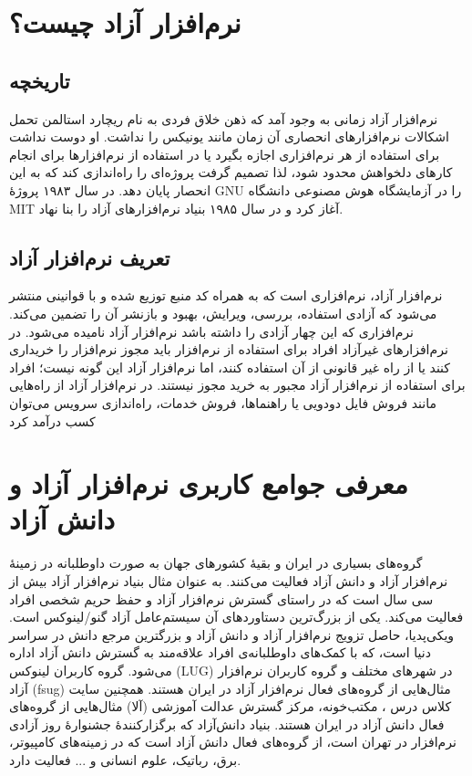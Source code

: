 \documentclass{article}
\begin{document}
\section{نرم‌افزار آزاد چیست؟}
\subsection{تاریخچه}
نرم‌افزار آزاد زمانی به وجود آمد که ذهن خلاق فردی به نام ریچارد استالمن تحمل اشکالات نرم‌افزارهای انحصاری آن زمان مانند یونیکس را نداشت. او دوست نداشت برای استفاده از هر نرم‌افزاری اجازه بگیرد یا در استفاده از نرم‌افزارها برای انجام کار‌های دلخواهش محدود شود، لذا تصمیم گرفت پروژه‌ای را راه‌اندازی کند که به این انحصار پایان دهد. در سال ۱۹۸۳ پروژهٔ GNU را در آزمایشگاه هوش مصنوعی دانشگاه MIT آغاز کرد و در سال ۱۹۸۵ بنیاد نرم‌افزار‌های آزاد را بنا نهاد.
\subsection{تعریف نرم‌افزار آزاد}
نرم‌افزار آزاد، نرم‌افزاری است که به همراه کد منبع توزیع شده و با قوانینی منتشر می‌شود که آزادی استفاده، بررسی، ویرایش، بهبود و بازنشر آن را تضمین می‌کند. نرم‌افزاری که این چهار آزادی را داشته باشد نرم‌افزار آزاد نامیده می‌شود. در نرم‌افزارهای غیرآزاد افراد برای استفاده از نرم‌افزار باید مجوز نرم‌افزار را خریداری کنند یا از راه غیر قانونی از آن استفاده کنند، اما نرم‌افزار آزاد این گونه نیست؛ افراد برای استفاده از نرم‌افزار آزاد مجبور به خرید مجوز نیستند. در نرم‌افزار آزاد از راه‌هایی مانند فروش فایل دودویی یا راهنماها، فروش خدمات، راه‌اندازی سرویس می‌توان کسب درآمد کرد
\section{معرفی جوامع کاربری نرم‌افزار آزاد و دانش آزاد}
گروه‌های بسیاری در ایران و بقیهٔ کشورهای جهان به صورت داوطلبانه در زمینهٔ نرم‌افزار آزاد و دانش آزاد فعالیت می‌کنند.
به عنوان مثال بنیاد نرم‌افزار آزاد بیش از سی سال است که در راستای گسترش نرم‌افزار آزاد و حفظ حریم شخصی افراد فعالیت می‌کند. یکی از بزرگ‌ترین دستاوردهای آن سیستم‌عامل آزاد گنو/لینوکس است.
ویکی‌پدیا، حاصل تزویج نرم‌افزار آزاد و دانش آزاد و بزرگترین مرجع دانش در سراسر دنیا است، که با کمک‌های داوطلبانه‌ی افراد علاقه‌مند به گسترش دانش آزاد اداره می‌شود.
گروه کاربران لینوکس (LUG) در شهرهای مختلف و گروه کاربران نرم‌افزار آزاد (fsug) مثال‌هایی از گروه‌های فعال نرم‌افزار آزاد در ایران هستند.
همچنین سایت کلاس درس
، مکتب‌خونه،‌ مرکز گسترش عدالت آموزشی (آلا) مثال‌هایی از گروه‌های فعال دانش آزاد در ایران هستند.
بنیاد دانش‌آزاد که برگزارکنندهٔ جشنوارهٔ روز آزادی نرم‌افزار در تهران است، از گروه‌های فعال دانش آزاد است که در زمینه‌های کامپیوتر، برق، رباتیک، علوم انسانی و ... فعالیت دارد.
\end{document}
